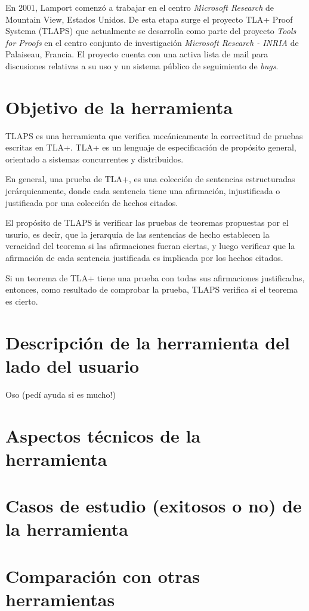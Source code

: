 \documentclass[spanish]{llncs}
\begin{document}
En 2001, Lamport comenzó a trabajar en el centro \textit{Microsoft Research} de Mountain View, Estados Unidos. De esta etapa surge el proyecto TLA+ Proof Systema (TLAPS) que actualmente se desarrolla como parte del proyecto \textit{Tools for Proofs} en el centro conjunto de investigación \textit{Microsoft Research - INRIA} de Palaiseau, Francia. El proyecto cuenta con una activa lista de mail para discusiones relativas a su uso y un sistema público de seguimiento de \textit{bugs}.


\section{Objetivo de la herramienta}

TLAPS es una herramienta que verifica mecánicamente la correctitud
de pruebas escritas en TLA+.
TLA+ es un lenguaje de especificación de propósito general, orientado a sistemas
concurrentes y distribuidos.

En general, una prueba de TLA+, es una colección de sentencias estructuradas jerárquicamente,
donde cada sentencia tiene una afirmación, injustificada o justificada por una colección de hechos citados.

El propósito de TLAPS is verificar las pruebas de teoremas propuestas por el usurio, es decir,
que la jerarquía de las sentencias de hecho establecen la veracidad del teorema si las afirmaciones fueran ciertas,
y luego verificar que la afirmación de cada sentencia justificada es implicada por los hechos citados.

Si un teorema de TLA+ tiene una prueba con todas sus afirmaciones justificadas, entonces, como resultado
de comprobar la prueba, TLAPS verifica si el teorema es cierto.

\section{Descripción de la herramienta del lado del usuario}

Oso (pedí ayuda si es mucho!)

\section{Aspectos técnicos de la herramienta}
\section{Casos de estudio (exitosos o no) de la herramienta}
\section{Comparación con otras herramientas}
\end{document}
